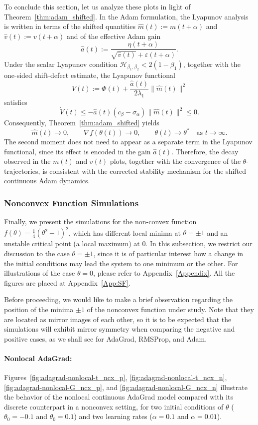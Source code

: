 \documentclass{article} %
\begin{document}
To conclude this section, let us analyze these plots in light of Theorem~\ref{thm:adam_shifted}. In the Adam formulation, the Lyapunov analysis is written in terms of the shifted quantities $\widehat m(t):=m(t+\alpha)$ and $\widehat v(t):=v(t+\alpha)$ and of the effective Adam gain
\[
    \widehat a(t)
    :=
    \frac{\eta(t+\alpha)}
    {\sqrt{\widehat v(t)}+\varepsilon(t+\alpha)}.
\]
Under the scalar Lyapunov condition $\mathcal H_{\beta_1,\beta_2}<2(1-\beta_1)$, together with the one-sided shift-defect estimate, the Lyapunov functional
\[
    V(t)
    :=
    \Phi(t)
    +
    \frac{\widehat a(t)}{2\lambda_1}\|\widehat m(t)\|^2
\]
satisfies
\[
    \dot V(t)
    \leq
    -\widehat a(t)(c_\beta-\sigma_\alpha)\|\widehat m(t)\|^2
    \leq 0.
\]
Consequently, Theorem~\ref{thm:adam_shifted} yields
\[
    \widehat m(t)\to0,
    \qquad
    \nabla f(\theta(t))\to0,
    \qquad
    \theta(t)\to\theta^*
    \quad\text{as }t\to\infty.
\]
The second moment does not need to appear as a separate term in the Lyapunov functional, since its effect is encoded in the gain $\widehat a(t)$. Therefore, the decay observed in the $m(t)$ and $v(t)$ plots, together with the convergence of the $\theta$-trajectories, is consistent with the corrected stability mechanism for the shifted continuous Adam dynamics.

\subsubsection{Nonconvex Function Simulations}

Finally, we present the simulations for the non-convex function $f(\theta)=\frac{1}{4}(\theta^2-1)^2$, which has different local minima at $\theta=\pm1$ and an unstable critical point (a local maximum) at $0$. In this subsection, we restrict our discussion to the case $\theta=\pm1$, since it is of particular interest how a change in the initial conditions may lead the system to one minimum or the other. For illustrations of the case $\theta=0$, please refer to Appendix~\ref{Appendix}. All the figures are placed at Appendix~\ref{App:SF}.

Before proceeding, we would like to make a brief observation regarding the position of the minima $\pm 1$ of the nonconvex function under study. Note that they are located as mirror images of each other, so it is to be expected that the simulations will exhibit mirror symmetry when comparing the negative and positive cases, as we shall see for AdaGrad, RMSProp, and Adam.


\paragraph{Nonlocal AdaGrad:} Figures~\ref{fig:adagrad-nonlocal-t_ncx_p}, \ref{fig:adagrad-nonlocal-t_ncx_n}, \ref{fig:adagrad-nonlocal-G_ncx_p}, and \ref{fig:adagrad-nonlocal-G_ncx_n} illustrate the behavior of the nonlocal continuous AdaGrad model compared with its discrete counterpart in a nonconvex setting, for two initial conditions of \(\theta\) (\(\theta_0=-0.1\) and \(\theta_0=0.1\)) and two learning rates (\(\alpha=0.1\) and \(\alpha=0.01\)). 
\end{document}
